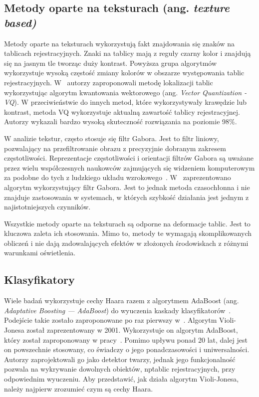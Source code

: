 \subsection{Metody oparte na teksturach (ang. \textit{texture based)}}
\label{subsec:metody-oparte-na-teksturach}
Metody oparte na teksturach wykorzystują fakt znajdowania się znaków na tablicach rejestracyjnych.
Znaki na tablicy mają z reguły czarny kolor i znajdują się na jasnym tle tworząc duży kontrast.
Powyższa grupa algorytmów wykorzystuje wysoką częstość zmiany kolorów w obszarze występowania tablic rejestracyjnych.
W~\cite{824138} autorzy zaproponowali metodę lokalizacji tablic wykorzystując algorytm kwantowania wektorowego (ang. \textit{Vector Quantization - VQ}).
W przeciwieństwie do innych metod, które wykorzystywały krawędzie lub kontrast, metoda VQ wykorzystuje aktualną zawartość tablicy rejestracyjnej.
Autorzy wykazali bardzo wysoką skuteczność rozwiązania na poziomie 98\%.

W analizie tekstur, często stosuje się filtr Gabora.
Jest to filtr liniowy, pozwalający na przefiltrowanie obrazu z precyzyjnie dobranym zakresem częstotliwości.
Reprezentacje częstotliwości i orientacji filtrów Gabora są uważane przez wielu współczesnych naukowców zajmujących się widzeniem komputerowym za podobne do tych z ludzkiego układu wzrokowego~\cite{gabor_human_eye}.
W~\cite{gabor_lpr} zaprezentowano algorytm wykorzystujący filtr Gabora.
Jest to jednak metoda czasochłonna i nie znajduje zastosowania w systemach, w których szybkość działania jest jednym z najistotniejszych czynników.

Wszystkie metody oparte na teksturach są odporne na deformacje tablic.
Jest to kluczowa zaleta ich stosowania.
Mimo to, metody te wymagają skomplikowanych obliczeń i nie dają zadowalających efektów w złożonych środowiskach z różnymi warunkami oświetlenia.

\subsection{Klasyfikatory}\label{subsec:klasyfikatory}
Wiele badań wykorzystuje cechy Haara razem z algorytmem AdaBoost (ang. \textit{Adaptative Boosting --- AdaBoost}) do wyuczenia kaskady klasyfikatorów~\cite{9310202}.
Podejście takie zostało zaproponowane po raz pierwszy w~\cite{990517}.
Algorytm Violi-Jonesa został zaprezentowany w 2001.
Wykorzystuje on algorytm AdaBoost, który został zaproponowany w pracy~\cite{Freund1996ExperimentsWA}.
Pomimo upływu ponad 20 lat, dalej jest on powszechnie stosowany, co świadczy o jego ponadczasowości i uniwersalności.
Autorzy zaprojektowali go jako detektor twarzy, jednak jego funkcjonalność pozwala na wykrywanie dowolnych obiektów, np\. tablic rejestracyjnych, przy odpowiednim wyuczeniu.
Aby przedstawić, jak działa algorytm Violi-Jonesa, należy najpierw zrozumieć czym są cechy Haara.

